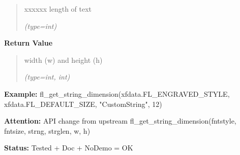 \begin{boxedminipage}{\funcwidth}
\begin{quote}
\begin{Ventry}{xxxxxx}
          length of text

            {\it (type=int)}

        \end{Ventry}

      \end{quote}

      \textbf{Return Value}
    \vspace{-1ex}

      \begin{quote}
      width (w) and height (h)

      {\it (type=int, int)}

      \end{quote}

\textbf{Example:} fl\_get\_string\_dimension(xfdata.FL\_ENGRAVED\_STYLE, 
xfdata.FL\_DEFAULT\_SIZE, "CustomString", 12)



\textbf{Attention:} API change from upstream fl\_get\_string\_dimension(fntstyle, fntsize, 
strng, strglen, w, h)



\textbf{Status:} Tested + Doc + NoDemo = OK



    \end{boxedminipage}

    \label{xformslib:flbasic:fl_get_string_dimension}

    \vspace{0.5ex}

